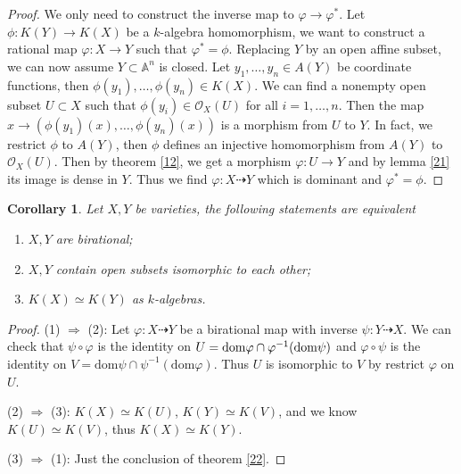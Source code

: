 \documentclass{amsart}
\theoremstyle{plain}
\newtheorem{corollary}{Corollary}
\theoremstyle{definition}
\theoremstyle{remark}
\numberwithin{equation}{section}
\begin{document}
\begin{proof}
	We only need to construct the inverse  map to $ \varphi\to \varphi^\ast $. Let $ \phi:K(Y)\to K(X) $ be a $ k $-algebra homomorphism, we want to construct a rational map $ \varphi:X\to Y $ such that $ \varphi^\ast=\phi $. Replacing $ Y $ by an open affine subset, we can now assume $ Y\subset \mathbb{A}^n $ is closed. Let $ y_1,\dots,y_n\in A(Y) $ be coordinate functions, then $ \phi(y_1),\dots,\phi(y_n)\in K(X) $. We can find a nonempty open subset $ U\subset X $ such that $ \phi(y_i)\in\mathcal{O}_X(U) $ for all $ i=1,\dots,n $. Then the map $ x\to (\phi(y_1)(x),\dots,\phi(y_n)(x)) $ is a morphism from $ U $ to $ Y $. In fact, we restrict $ \phi $ to $ A(Y) $, then $ \phi $ defines an injective homomorphism from $ A(Y) $ to $ \mathcal{O}_X(U) $. Then by theorem \ref{12}, we get a morphism $ \varphi:U\to Y $ and by lemma \ref{21} its image is dense in $ Y $. Thus we find $ \varphi:X\dashrightarrow Y $ which is dominant and $ \varphi^\ast=\phi $.
\end{proof}
\begin{corollary}
	Let $ X,Y $ be varieties, the following statements are equivalent
	\begin{enumerate}
		\item $ X,Y $ are birational;
		\item $ X,Y $ contain open subsets isomorphic to each other;
		\item $ K(X)\simeq K(Y) $ as $ k $-algebras.
	\end{enumerate}
\end{corollary}
\begin{proof}
(1) $ \Rightarrow $ (2): Let $ \varphi:X\dashrightarrow Y  $ be a birational map with inverse $ \psi :Y\dashrightarrow X $. We can check that $ \psi\circ\varphi $ is the identity on $ U= \mathrm{dom}\varphi\cap \varphi^{-1}(\rm{dom}\psi) $ and $ \varphi\circ\psi $ is the identity on $ V= \mathrm{dom}\psi\cap\psi^{-1}(\mathrm{dom}\varphi) $. Thus $ U $ is isomorphic to  $ V $ by restrict $ \varphi $ on $ U $.

(2) $ \Rightarrow $ (3): $ K(X)\simeq K(U) $, $ K(Y)\simeq K(V) $, and we know $ K(U)\simeq K(V) $, thus $ K(X)\simeq K(Y) $.

(3) $ \Rightarrow $ (1): Just the conclusion of theorem \ref{22}.
\end{proof}
\end{document}
